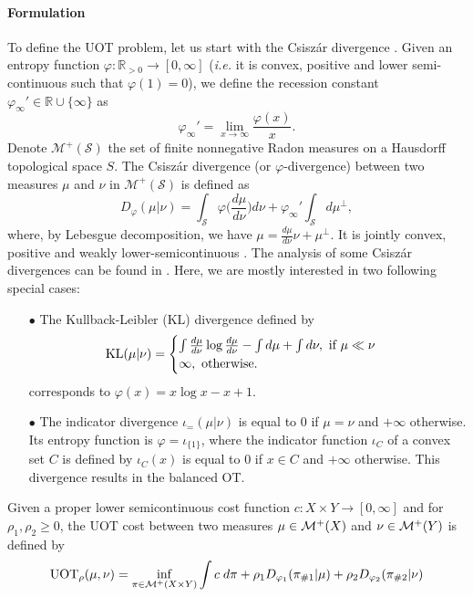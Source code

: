 \paragraph{Formulation} To define the UOT problem, let us start with
the Csiszár divergence \citep{Csiszar63}. Given an entropy function
$\varphi : \mathbb R_{> 0} \to [0, \infty]$ (\textit{i.e.} it is convex,
positive and lower semi-continuous such that $\varphi(1) = 0$), we define
the recession constant $\varphi_{\infty}' \in \mathbb R \cup \{ \infty \}$ as
\begin{equation}
  \varphi_{\infty}' = \lim_{x \to \infty} \frac{\varphi(x)}{x}.
\end{equation}
Denote $\mathcal M^+(\mathcal S)$ the set of finite nonnegative Radon measures on a
Hausdorff topological space $S$. The Csiszár divergence (or $\varphi$-divergence) between
two measures $\mu$ and $\nu$ in $\mathcal M^+(\mathcal S)$ is defined as
\begin{equation}
  D_{\varphi}(\mu \vert \nu) = \int_\mathcal S \varphi \Big( \frac{d\mu}{d\nu} \Big) d\nu +
  \varphi_{\infty}' \int_\mathcal S d\mu^{\perp},
\end{equation}
where, by Lebesgue decomposition, we have $\mu = \frac{d\mu}{d\nu} \nu + \mu^{\perp}$.
It is jointly convex, positive and weakly lower-semicontinuous \citep{Liero18}.
The analysis of some Csiszár divergences can be found in \citep{Sejourne19}.
Here, we are mostly interested in two following special cases:
\begin{itemize}
  \item[$\bullet$] The Kullback-Leibler (KL) divergence defined by
  \begin{equation}
    \text{KL}(\mu \vert \nu) =
    \begin{cases}
      \int \frac{d \mu}{ d \nu} \log \frac{d \mu}{ d \nu} - \int d\mu + \int d\nu,
      \text{ if } \mu \ll \nu \\
      \infty, \text{ otherwise}.
    \end{cases}
  \end{equation}
  corresponds to $\varphi(x) = x \log x - x + 1$.

  \item[$\bullet$] The indicator divergence $\iota_{=}(\mu \vert \nu)$ is equal to $0$
  if $\mu = \nu$ and $+\infty$ otherwise.
  Its entropy function is $\varphi = \iota_{\{ 1 \}}$, where the indicator function $\iota_C$
  of a convex set $C$ is defined by $\iota_C(x)$ is equal to $0$ if $x\in C$ and $+\infty$ otherwise.
  This divergence results in the balanced OT.
\end{itemize}
Given a proper lower semicontinuous cost function $c: X \times Y \to [0, \infty]$
and for $\rho_1, \rho_2 \geq 0$, the UOT cost between two measures $\mu \in \mathcal M^+(X)$ and
$\nu \in \mathcal M^+(Y)$ is defined by
\begin{align*}
  \text{UOT}_{\rho}(\mu, \nu) = \inf_{\pi \in \mathcal M^+(X \times Y)} \int c \; d\pi
  + \rho_1 D_{\varphi_1}(\pi_{\# 1} | \mu)
  + \rho_2 D_{\varphi_2}(\pi_{\# 2} | \nu)
\end{align*}

